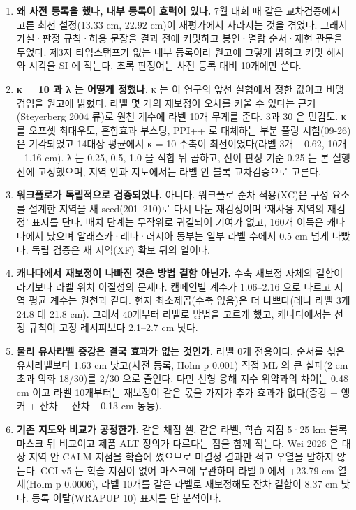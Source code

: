 \begin{enumerate}[leftmargin=1.8em, itemsep=0.45em, label=\textbf{Q\arabic*.}]
  \item \textbf{왜 사전 등록을 했나, 내부 등록이 효력이 있나.} 7월 대회 때 같은 교차검증에서 고른 최선 설정(13.33 cm, 22.92 cm)이 재평가에서 사라지는 것을 겪었다. 그래서 가설·판정 규칙·허용 문장을 결과 전에 커밋하고 봉인·열람 순서·재현 관문을 두었다. 제3자 타임스탬프가 없는 내부 등록이라 원고에 그렇게 밝히고 커밋 해시와 시각을 SI 에 적는다. 초록 판정어는 사전 등록 대비 10개에만 쓴다.
  \item \textbf{κ = 10 과 λ 는 어떻게 정했나.} κ 는 이 연구의 앞선 실험에서 정한 값이고 비맹검임을 원고에 밝혔다. 라벨 몇 개의 재보정이 오차를 키울 수 있다는 근거(Steyerberg 2004 류)로 원천 계수에 라벨 10개 무게를 준다. 3과 30 은 민감도. κ 를 오프셋 최대우도, 혼합효과 부스팅, PPI++ 로 대체하는 부분 풀링 시험(09-26)은 기각되었고 14대상 평균에서 κ = 10 수축이 최선이었다(라벨 3개 −0.62, 10개 −1.16 cm). λ 는 {0.25, 0.5, 1.0} 을 적합 뒤 곱하고, 전이 판정 기준 0.25 는 본 실행 전에 고정했으며, 지역 안과 지도에서는 라벨 안 블록 교차검증으로 고른다.
  \item \textbf{워크플로가 독립적으로 검증되었나.} 아니다. 워크플로 순차 적용(XC)은 구성 요소를 설계한 지역을 새 seed(201–210)로 다시 나눈 재검정이며 ‘재사용 지역의 재검정’ 표지를 단다. 배치 단계는 무작위로 귀결되어 기여가 없고, 160개 이득은 캐나다에서 났으며 알래스카·레나·러시아 동부는 일부 라벨 수에서 0.5 cm 넘게 나빴다. 독립 검증은 새 지역(XF) 확보 뒤의 일이다.
  \item \textbf{캐나다에서 재보정이 나빠진 것은 방법 결함 아닌가.} 수축 재보정 자체의 결함이라기보다 라벨 위치 이질성의 문제다. 캠페인별 계수가 1.06–2.16 으로 다르고 지역 평균 계수는 원천과 같다. 현지 최소제곱(수축 없음)은 더 나쁘다(레나 라벨 3개 24.8 대 21.8 cm). 그래서 40개부터 라벨로 방법을 고르게 했고, 캐나다에서는 선정 규칙이 고정 레시피보다 2.1–2.7 cm 낫다.
  \item \textbf{물리 유사라벨 증강은 결국 효과가 없는 것인가.} 라벨 0개 전용이다. 순서를 섞은 유사라벨보다 1.63 cm 낫고(사전 등록, Holm p 0.001) 직접 ML 의 큰 실패(2 cm 초과 악화 18/30)를 2/30 으로 줄인다. 다만 선형 융해 지수 위약과의 차이는 0.48 cm 이고 라벨 10개부터는 재보정이 같은 몫을 가져가 추가 효과가 없다(증강 + 앵커 + 잔차 − 잔차 −0.13 cm 동등).
  \item \textbf{기존 지도와 비교가 공정한가.} 같은 채점 셀, 같은 라벨, 학습 지점 5·25 km 블록 마스크 뒤 비교이고 제품 ALT 정의가 다르다는 점을 함께 적는다. Wei 2026 은 대상 지역 안 CALM 지점을 학습에 썼으므로 미결정 결과만 적고 우열을 말하지 않는다. CCI v5 는 학습 지점이 없어 마스크에 무관하며 라벨 0 에서 +23.79 cm 열세(Holm p 0.0006), 라벨 10개를 같은 라벨로 재보정해도 잔차 결합이 8.37 cm 낫다. 등록 이탈(WRAPUP 10) 표지를 단 분석이다.

\end{enumerate}
